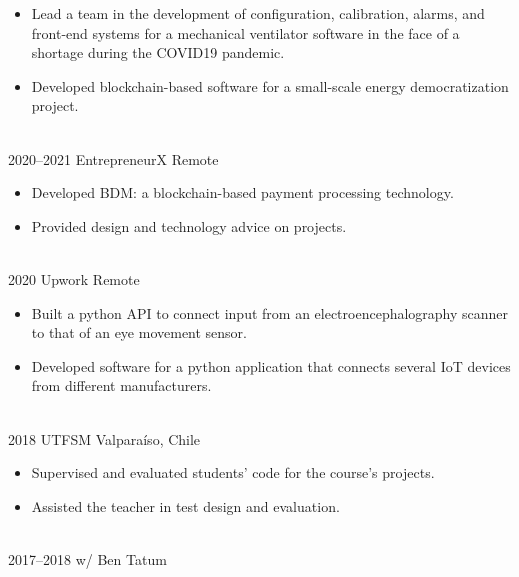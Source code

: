 \documentclass[a4paper]{cv-style}
\begin{document}
\begin{entrylist}
{\begin{itemize}
                    Developed an EPICS-based slow controls system for the CLAS12 Run Group E's double target system.
                \item
                    Lead a team in the development of configuration, calibration, alarms, and front-end systems for a mechanical ventilator software in the face of a shortage during the COVID19 pandemic.
                \item
                    Developed blockchain-based software for a small-scale energy democratization project.
            \end{itemize}} \\
        \entry
            {2020--2021}
            {EntrepreneurX}
            {Remote}
            {
            \begin{itemize}
                \item
                    Developed BDM: a blockchain-based payment processing technology.
                \item
                    Provided design and technology advice on projects.
            \end{itemize}} \\
        \entry
            {2020}
            {Upwork}
            {Remote}
            {
            \begin{itemize}
                \item
                    Built a python API to connect input from an electroencephalography scanner to that of an eye movement sensor.
                \item
                    Developed software for a python application that connects several IoT devices from different manufacturers.
            \end{itemize}} \\
        \entry
            {2018}
            {UTFSM}
            {Valpara\'iso, Chile}
            {
            \begin{itemize}
                \item
                    Supervised and evaluated students' code for the course's projects.
                \item
                    Assisted the teacher in test design and evaluation.
            \end{itemize}} \\
        \entry
            {2017--2018}
            {w/ Ben Tatum}

\end{entrylist}
\end{document}
